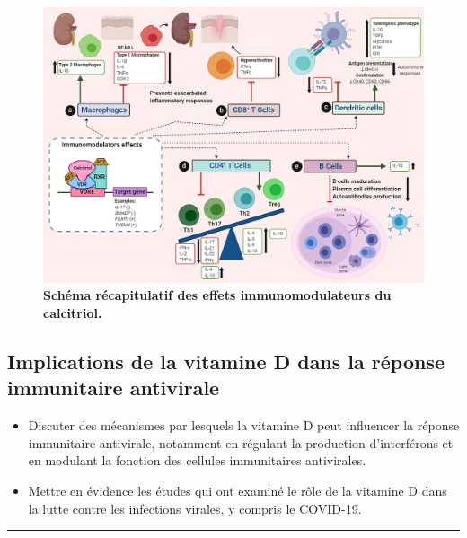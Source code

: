 \documentclass[
  a4paper,
  DIV=11,
  numbers=noendperiod,
  listof=totoc]{scrreprt}
\begin{document}
\begin{figure}

{\centering \includegraphics{figures/calcitriol-immunomodulatory.jpg}

}

\caption[\textbf{Schéma récapitulatif des effets immunomodulateurs du
calcitriol.}]{\label{fig-immunomod}\textbf{Schéma récapitulatif des
effets immunomodulateurs du calcitriol.} \textcite{Meza-Meza.2022}}

\end{figure}

\hypertarget{implications-de-la-vitamine-d-dans-la-ruxe9ponse-immunitaire-antivirale}{%
\subsection{Implications de la vitamine D dans la réponse immunitaire
antivirale}\label{implications-de-la-vitamine-d-dans-la-ruxe9ponse-immunitaire-antivirale}}

\begin{itemize}
\item
  Discuter des mécanismes par lesquels la vitamine D peut influencer la
  réponse immunitaire antivirale, notamment en régulant la production
  d'interférons et en modulant la fonction des cellules immunitaires
  antivirales.
\item
  Mettre en évidence les études qui ont examiné le rôle de la vitamine D
  dans la lutte contre les infections virales, y compris le COVID-19.
\end{itemize}

\begin{center}\rule{0.5\linewidth}{0.5pt}\end{center}
\end{document}
